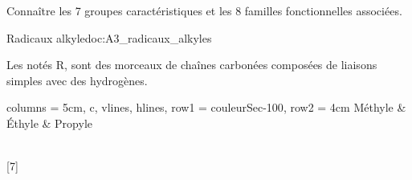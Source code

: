 \tetePremStssOrga

\vspace*{-34pt}

\begin{objectifs}
  \item Connaître les 7 groupes caractéristiques et les 8 familles fonctionnelles associées.
\end{objectifs}



\begin{doc}{Radicaux alkyle}{doc:A3_radicaux_alkyles}
  \begin{importants}
    Les  notés R, sont des morceaux de chaînes carbonées composées de liaisons simples avec des hydrogènes.
  \end{importants}

  \centering
  \begin{tblr}{
    columns = {5cm, c}, vlines, hlines,
    row{1} = {couleurSec-100},
    row{2} = {4cm}
  }
    Méthyle & Éthyle & Propyle \\
    \\
  \end{tblr}
\end{doc}

[7]


